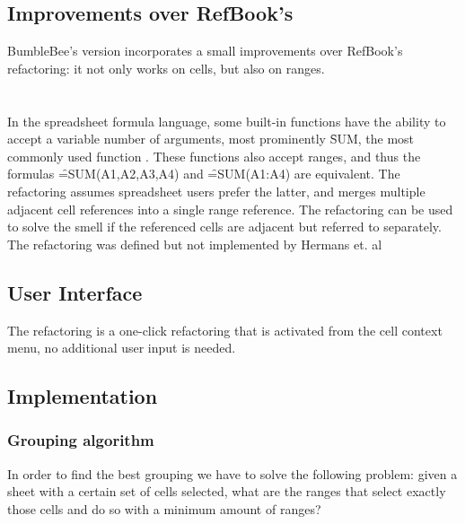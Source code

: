 \subsection{Improvements over RefBook's }

BumbleBee's version incorporates a small improvements over RefBook's refactoring: it not only works on cells, but also on ranges.

\newpage

\section{}
\label{refac:groupreferences}

In the spreadsheet formula language, some built-in functions have the ability to accept a variable number of arguments, most prominently \f{SUM}, the most commonly used function \cite{hermans2015enron}.
These functions also accept ranges, and thus the formulas \f{=SUM(A1,A2,A3,A4)} and \f{=SUM(A1:A4)} are equivalent.
The  refactoring assumes spreadsheet users prefer the latter, and merges multiple adjacent cell references into a single range reference.
The refactoring can be used to solve the  \cite{hermans2014detecting} smell if the referenced cells are adjacent but referred to separately.
The refactoring was defined but not implemented by Hermans et. al \cite{hermans2014detecting}

\subsection{User Interface}

The refactoring is a one-click refactoring that is activated from the cell context menu, no additional user input is needed.

\subsection{Implementation}

\subsubsection{Grouping algorithm}

In order to find the best grouping we have to solve the following problem: given a sheet with a certain set of cells selected, what are the ranges that select exactly those cells and do so with a minimum amount of ranges?

